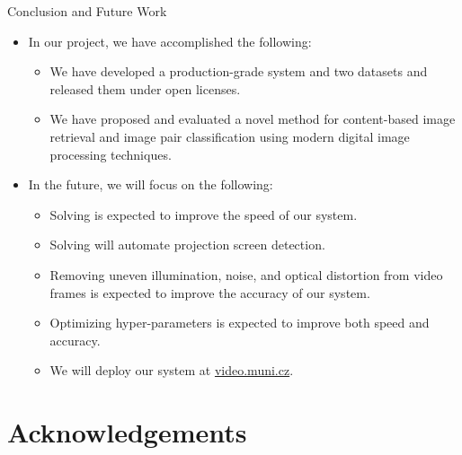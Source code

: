 \begin{frame}{Conclusion and Future Work}
\begin{itemize}
\item<1-7> In our project, we have accomplished the following:
\begin{itemize}
\item<1-7> We have developed a \alert{production-grade system} and \alert{two
  datasets} and released them under open licenses.
\item<2-7> We have proposed and evaluated a \alert{novel method} for content-based
  image retrieval and image pair classification using \alert{modern digital
  image processing techniques}.
\end{itemize}
\item<3-7> In the future, we will focus on the following:
\begin{itemize}
\item<3-7> Solving  is expected to \alert{improve the speed} of our system.
\item<4-7> Solving  will \alert{automate projection screen detection}.
\item<5-7> Removing \alert{uneven illumination}, \alert{noise}, and \alert{optical
  distortion} from video frames is expected to \alert{improve the accuracy} of our system.
\item<6-7> Optimizing \alert{hyper-parameters} is expected to \alert{improve
  both speed and accuracy}.
\item<7-7> We will deploy our system at \href{https://video.muni.cz/}{video.muni.cz}.
\end{itemize}
\end{itemize}
\end{frame}

\section{Acknowledgements}

